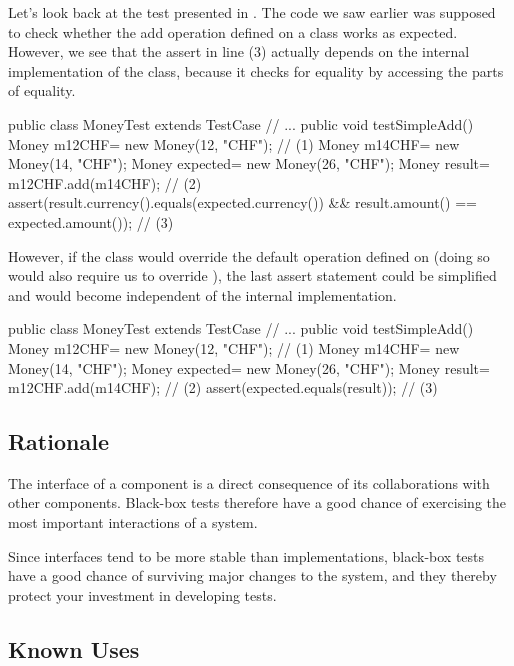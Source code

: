 \documentclass[a4paper,10pt,twoside]{book}
\begin{document}
Let's look back at the test presented in . The code we saw earlier was supposed to check whether the add operation defined on a class  works as expected. However, we see that the assert in line (3) actually depends on the internal implementation of the  class, because it checks for equality by accessing the parts of equality.

\begin{code}
public class MoneyTest extends TestCase {
	// ...
		public void testSimpleAdd() {
			Money m12CHF= new Money(12, "CHF");                 // (1)
			Money m14CHF= new Money(14, "CHF");        
			Money expected= new Money(26, "CHF");
			Money result= m12CHF.add(m14CHF);                      // (2)
			assert(result.currency().equals(expected.currency())
				&& result.amount() == expected.amount());            // (3)
		}
}
\end{code}

However, if the class  would override the default  operation defined on  (doing so would also require us to override ), the last assert statement could be simplified and would become independent of the internal implementation.

\begin{code}
public class MoneyTest extends TestCase {
	// ...
		public void testSimpleAdd() {
			Money m12CHF= new Money(12, "CHF");            // (1)
			Money m14CHF= new Money(14, "CHF");        
			Money expected= new Money(26, "CHF");
			Money result= m12CHF.add(m14CHF);                // (2)
			assert(expected.equals(result));                            // (3)
		}
}
\end{code}

\subsection*{Rationale}

The interface of a component is a direct consequence of its collaborations with other components. Black-box tests therefore have a good chance of exercising the most important interactions of a system.

Since interfaces tend to be more stable than implementations, black-box tests have a good chance of surviving major changes to the system, and they thereby protect your investment in developing tests.

\subsection*{Known Uses}
\end{document}
